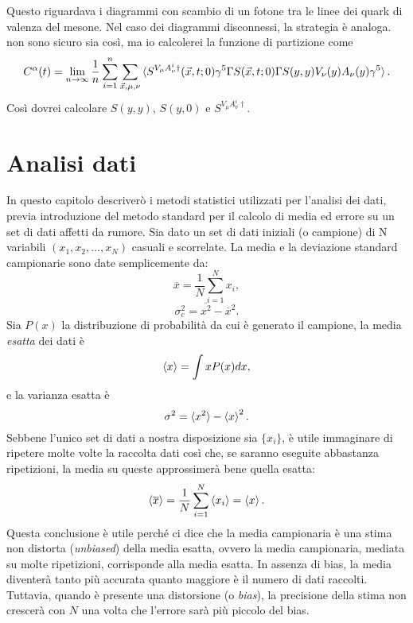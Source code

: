 \documentclass[LaM]{sapthesis}
\begin{document}
	Questo riguardava i diagrammi con scambio di un fotone tra le linee dei quark di valenza del mesone. Nel caso dei diagrammi disconnessi, la strategia è analoga.
	\color{red} non sono sicuro sia così, ma io calcolerei la funzione di partizione come
	\begin{equation*}
	C^\alpha(t)=\lim_{n\to\infty}\frac{1}{n}\sum_{i=1}^{n}\sum_{\vec{x},\mu,\nu} \braket{S^{V_\mu A_\nu^i\dagger}(\vec{x},t;0)\gamma^5\Gamma S(\vec{x},t;0)\Gamma S(y,y)V_\nu(y)A_\nu(y)\gamma^5}.
	\end{equation*}
	Così dovrei calcolare $S(y,y)$, $S(y,0)$ e $S^{V_\mu A_\nu^i\dagger}$\color{black}.
	
	
	\chapter{Analisi dati}
	In questo capitolo descriverò i metodi statistici utilizzati per l'analisi dei dati, previa introduzione del metodo standard per il calcolo di media ed errore su un set di dati affetti da rumore.
	Sia dato un set di dati iniziali (o campione) di N variabili $(x_1, x_2, ..., x_N)$ casuali e scorrelate. La media e la deviazione standard campionarie sono date semplicemente da:
	\begin{equation}
		\overline{x}=\frac{1}{N} \sum_{i=1}^{N}x_i,
	\end{equation}
	\begin{equation}
	\sigma^2_c=\overline{x^2}-\overline{x}^2.
	\end{equation}
	Sia $P(x)$ la distribuzione di probabilità da cui è generato il campione, la media \emph{esatta} dei dati è
	\begin{equation}
		\braket{x}=\int x P(x) dx,
	\end{equation}
	e la varianza esatta è
	\begin{equation}\label{varianza_campionaria}
		\sigma^2=\braket{x^2}-\braket{x}^2.
	\end{equation}
	Sebbene l'unico set di dati a nostra disposizione sia $\{x_i\}$, è utile immaginare di ripetere molte volte la raccolta dati così che, se saranno eseguite abbastanza ripetizioni, la media su queste approssimerà bene quella esatta:
	\begin{equation}
		\braket{\overline{x}}=\frac{1}{N}\sum_{i=1}^{N}\braket{x_i}=\braket{x}.
	\end{equation}
	Questa conclusione è utile perché ci dice che la media campionaria è una stima non distorta (\emph{unbiased}) della media esatta, ovvero la media campionaria, mediata su molte ripetizioni, corrisponde alla media esatta. In assenza di bias, la media diventerà tanto più accurata quanto maggiore è il numero di dati raccolti. Tuttavia, quando è presente una distorsione (o \emph{bias}), la precisione della stima non crescerà con $N$ una volta che l'errore sarà più piccolo del bias.
	
\end{document}
